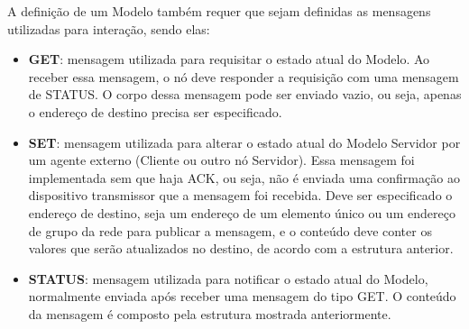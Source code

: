\documentclass[../monografia.tex]{subfiles}
\begin{document}
	
	
	

A definição de um Modelo também requer que sejam definidas as mensagens utilizadas para interação, sendo elas:

\begin{itemize}
	\item \textbf{GET}: mensagem utilizada para requisitar o estado atual do Modelo. Ao receber essa mensagem, o nó deve responder a requisição com uma mensagem de STATUS. O corpo dessa mensagem pode ser enviado vazio, ou seja, apenas o endereço de destino precisa ser especificado.
	\item \textbf{SET}: mensagem utilizada para alterar o estado atual do Modelo Servidor por um agente externo (Cliente ou outro nó Servidor). Essa mensagem foi implementada sem que haja ACK, ou seja, não é enviada uma confirmação ao dispositivo transmissor que a mensagem foi recebida. Deve ser especificado o endereço de destino, seja um endereço de um elemento único ou um endereço de grupo da rede para publicar a mensagem, e o conteúdo deve conter os valores que serão atualizados no destino, de acordo com a estrutura anterior.
	\item \textbf{STATUS}: mensagem utilizada para notificar o estado atual do Modelo, normalmente enviada após receber uma mensagem do tipo GET. O conteúdo da mensagem é composto pela estrutura mostrada anteriormente.
\end{itemize}
\end{document}
